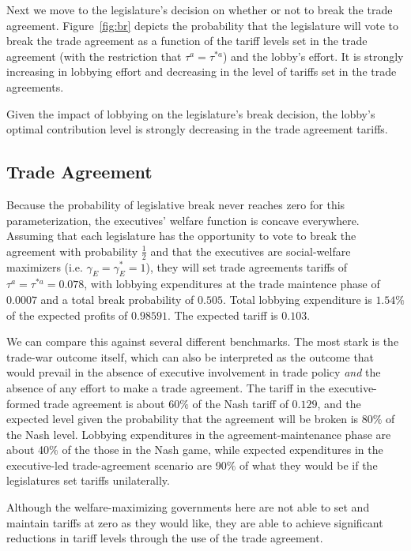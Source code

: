 \documentclass[10pt]{article}
\newcommand{\ga}{\gamma}
\begin{document}
Next we move to the legislature's decision on whether or not to break the trade agreement. Figure~\ref{fig:br} depicts the probability that the legislature will vote to break the trade agreement as a function of the tariff levels set in the trade agreement (with the restriction that $\tau^a = \tau^{*a}$) and the lobby's effort. It is strongly increasing in lobbying effort and decreasing in the level of tariffs set in the trade agreements.

Given the impact of lobbying on the legislature's break decision, the lobby's optimal contribution level is strongly decreasing in the trade agreement tariffs.%

\subsection{Trade Agreement}
Because the probability of legislative break never reaches zero for this parameterization, the executives' welfare function is concave everywhere. Assuming that each legislature has the opportunity to vote to break the agreement with probability $\frac{1}{2}$ and that the executives are social-welfare maximizers (i.e. $\ga_E = \ga_E^* = 1$), they will set trade agreements tariffs of $\tau^a = \tau^{*a} = 0.078$, with lobbying expenditures at the trade maintence phase of $0.0007$ and a total break probability of $0.505$. Total lobbying expenditure is $1.54\%$ of the expected profits of $0.98591$. The expected tariff is $0.103$.

We can compare this against several different benchmarks. The most stark is the trade-war outcome itself, which can also be interpreted as the outcome that would prevail in the absence of executive involvement in trade policy \textit{and} the absence of any effort to make a trade agreement. The tariff in the executive-formed trade agreement is about 60$\%$ of the Nash tariff of $0.129$, and the expected level given the probability that the agreement will be broken is 80$\%$ of the Nash level. Lobbying expenditures in the agreement-maintenance phase are about 40$\%$ of the those in the Nash game, while expected expenditures in the executive-led trade-agreement scenario are 90$\%$ of what they would be if the legislatures set tariffs unilaterally.

Although the welfare-maximizing governments here are not able to set and maintain tariffs at zero as they would like, they are able to achieve significant reductions in tariff levels through the use of the trade agreement.
\end{document}
